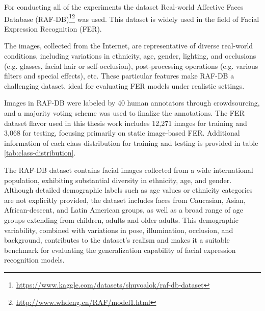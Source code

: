 For conducting all of the experiments the dataset Real-world Affective Faces Database (RAF-DB)\footnote{\url{https://www.kaggle.com/datasets/shuvoalok/raf-db-dataset}}\footnote{\url{http://www.whdeng.cn/RAF/model1.html}} was used. This dataset is widely used in the field of Facial Expression Recognition (\gls{FER}).

The images, collected from the Internet, are representative of diverse real-world conditions, including variations in ethnicity, age, gender, lighting, and occlusions (e.g. glasses, facial hair or self-occlusion), post-processing operations (e.g. various filters and special effects), etc. These particular features make RAF-DB a challenging dataset, ideal for evaluating FER models under realistic settings.

Images in RAF-DB were labeled by 40 human annotators through crowdsourcing, and a majority voting scheme was used to finalize the annotations. The FER dataset flavor used in this thesis work includes 12,271 images for training and 3,068 for testing, focusing primarily on static image-based FER. Additional information of each class distribution for training and testing is provided in table \ref{tab:class-distribution}. 

The RAF-DB dataset contains facial images collected from a wide international population, exhibiting substantial diversity in ethnicity, age, and gender. Although detailed demographic labels such as age values or ethnicity categories are not explicitly provided, the dataset includes faces from Caucasian, Asian, African-descent, and Latin American groups, as well as a broad range of age groups extending from children, adults and older adults. This demographic variability, combined with variations in pose, illumination, occlusion, and background, contributes to the dataset’s realism and makes it a suitable benchmark for evaluating the generalization capability of facial expression recognition models.

